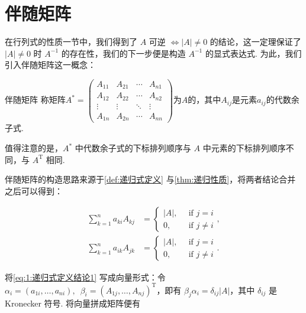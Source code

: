 \section{伴随矩阵}

在行列式的性质一节中，我们得到了 $A$ 可逆 $\iff |A| \neq 0$ 的结论，这一定理保证了 $|A| \neq 0$ 时 $A^{-1}$ 的存在性，我们的下一步便是构造 $A^{-1}$ 的显式表达式. 为此，我们引入伴随矩阵这一概念：

\begin{definition}{伴随矩阵}{}
    称矩阵$A^*=\begin{pmatrix}
            A_{11} & A_{21} & \cdots & A_{n1} \\
            A_{12} & A_{22} & \cdots & A_{n2} \\
            \vdots & \vdots & \ddots & \vdots \\
            A_{1n} & A_{2n} & \cdots & A_{nn}
        \end{pmatrix}$为$A$的，其中$A_{ij}$是元素$a_{ij}$的代数余子式.
\end{definition}

值得注意的是，$A^*$ 中代数余子式的下标排列顺序与 $A$ 中元素的下标排列顺序不同，与 $A^{\mathrm{T}}$ 相同.

伴随矩阵的构造思路来源于\autoref{def:递归式定义} 与\autoref{thm:递归性质}，将两者结论合并之后可以得到：

\begin{align}
    \label{eq:1:递归式定义结论1}
    \sum\limits_{k=1}^{n} a_{ki} A_{kj} &= \begin{cases}
        |A|, \enspace &\text{if } j = i \\
        0, \enspace &\text{if } j \neq i
    \end{cases}, \\
    \label{eq:1:递归式定义结论2}
    \sum\limits_{k=1}^{n} a_{ik} A_{jk} &= \begin{cases}
        |A|, \enspace &\text{if } j = i \\
        0, \enspace &\text{if } j \neq i
    \end{cases}.
\end{align}

将\autoref{eq:1:递归式定义结论1} 写成向量形式：令 $\alpha_i = (a_{1i},\ldots,a_{ni}), \enspace \beta_i = (A_{1j}, \ldots, A_{nj})^{\mathrm{T}}$，即有 $\beta_j \alpha_i = \delta_{ij}|A|$，其中 $\delta_{ij}$ 是 Kronecker 符号. 将向量拼成矩阵便有

